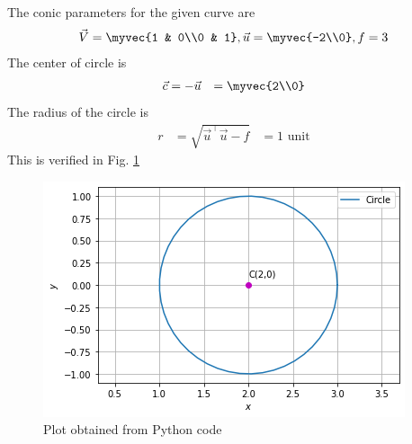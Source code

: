 The conic parameters for the given curve are
\begin{align}\label{4/4/eq:eq3}
\vec{V} = \myvec{1 & 0\\0 & 1} ,
\vec{u} = \myvec{-2\\0} , 
f = 3
\end{align}
The center of circle is 
\begin{align}\label{4/4/eq:eq4}
\vec{c} &= -  \vec{u}
&= \myvec{2\\0} 
\end{align}
The radius of the circle is
\begin{align}\label{4/4/eq:eq6}
r &= \sqrt{\vec{u}^\top \vec{u} -f}
&= 1 \text{ unit}
\end{align}
This is verified in Fig. \ref{4/4/Fig:1}
\begin{figure}[h]
%
\centering
\includegraphics[width=\columnwidth]{solutions/4/4/image.png}
\caption{Plot obtained from Python code}
\label{4/4/Fig:1}
\end{figure}
